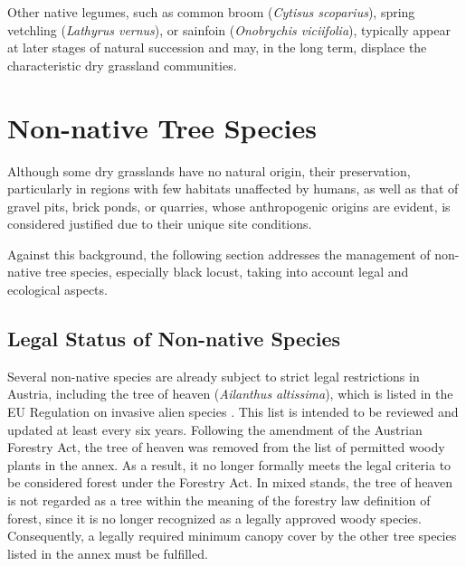 Other native legumes, such as common broom (\emph{Cytisus scoparius}), spring vetchling (\emph{Lathyrus vernus}), or sainfoin (\emph{Onobrychis viciifolia}), typically appear at later stages of natural succession and may, in the long term, displace the characteristic dry grassland communities.

\section{Non-native Tree Species}


Although some dry grasslands have no natural origin, their preservation, particularly in regions with few habitats unaffected by humans, as well as that of gravel pits, brick ponds, or quarries, whose anthropogenic origins are evident, is considered justified due to their unique site conditions.

Against this background, the following section addresses the management of non-native tree species, especially black locust, taking into account legal and ecological aspects.


\subsection{Legal Status of Non-native Species}%

Several non-native species are already subject to strict legal restrictions in Austria, including the tree of heaven (\emph{Ailanthus altissima}), which is listed in the EU Regulation on invasive alien species \citep{eu2019verordnungListeInvasiverArten,eu2014verordnungInvasiverArten}. This list is intended to be reviewed and updated at least every six years. Following the amendment of the Austrian Forestry Act, the tree of heaven was removed from the list of permitted woody plants in the annex. As a result, it no longer formally meets the legal criteria to be considered forest under the Forestry Act. In mixed stands, the tree of heaven is not regarded as a tree within the meaning of the forestry law definition of forest, since it is no longer recognized as a legally approved woody species. Consequently, a legally required minimum canopy cover by the other tree species listed in the annex must be fulfilled.

